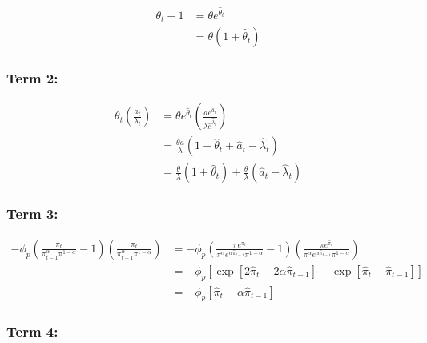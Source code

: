 \documentclass[11pt,preprint, authoryear]{elsarticle}
\numberwithin{equation}{section}
\numberwithin{figure}{section}
\numberwithin{table}{section}
\begin{document}
\[\begin{aligned} \theta_{t}-1 & = \theta e^{\hat{\theta}_{t}} \\
& = \theta\left(1+\hat{\theta}_{t}\right) \end{aligned}\]

\hypertarget{term-2}{%
\subsubsection{Term 2:}\label{term-2}}

\[\begin{aligned} \theta_{t}\left(\frac{a_{t}}{\lambda_{t}}\right) &= \theta e^{\hat{\theta}_{t}}\left(\frac{a e^{\hat{a}_{t}}}{\lambda \hat{e}^{\hat{\lambda}_t}}\right)\\
&= \frac{\theta a}{\lambda}\left(1+\hat{\theta}_{t}+\hat{a}_{t}-\hat{\lambda}_{t}\right)\\
& = \frac{\theta}{\lambda}\left(1+\hat{\theta}_{t} \right)+ \frac{\theta}{\lambda} \left(\hat{a}_{t}-\hat{\lambda}_{t}\right)\end{aligned}\]

\hypertarget{term-3}{%
\subsubsection{Term 3:}\label{term-3}}

\[\begin{aligned}
-\phi_{p}\left(\frac{\pi_{t}}{\pi_{t-1}^{\alpha} \pi^{1-\alpha}}-1\right)\left(\frac{\pi_{t}}{\pi_{t-1}^{\alpha} \pi^{1-\alpha}}\right) &= -\phi_{p}\left(\frac{\pi e^{\pi_{t}}}{\pi^{\alpha} e^{\alpha \hat{\pi}_{t-1}} \pi^{1-\alpha}}-1\right)\left(\frac{\pi e^{\hat{\pi}_t}}{\pi^{\alpha} e^{\alpha \hat{\pi}_{t-1}} \pi^{1-\alpha}}\right)\\
&= -\phi_p\left[\exp \left[2 \hat{\pi}_{t}-2 \alpha \hat{\pi}_{t-1}\right]-\exp \left[\hat{\pi}_{t}-\hat{\pi}_{t-1}\right]\right]\\
&=-\phi_p\left[\hat{\pi}_{t}-\alpha \hat{\pi}_{t-1}\right]
 \end{aligned}\]

\hypertarget{term-4}{%
\subsubsection{Term 4:}\label{term-4}}
\end{document}
